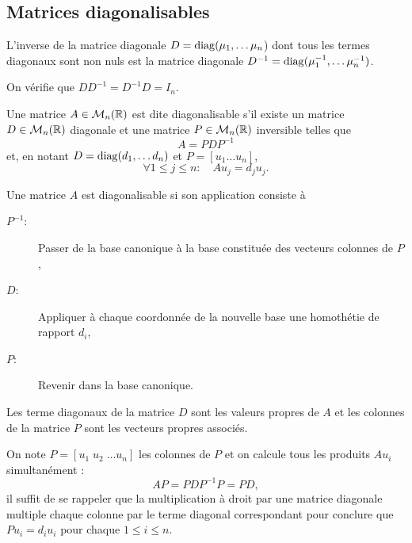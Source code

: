\subsection{Matrices diagonalisables} \label{sec:MatDiag}

\begin{lemma*}
  L'inverse de la matrice diagonale $D = \operatorname{diag}(\mu_1, \dots \mu_n$) dont tous les termes diagonaux sont non nuls est la matrice diagonale $D^{-1} = \operatorname{diag}(\mu_1^{-1}, \dots \mu_n^{-1})$.
\end{lemma*}

\proof
On vérifie que $D D^{-1} = D^{-1} D = I_n$.
\eproof

\begin{definition*}
  Une matrice $A \in \mathcal{M}_n(\mathbb{R})$ est dite diagonalisable s'il existe un matrice $D \in \mathcal{M}_n(\mathbb{R})$ diagonale et une matrice $P \in \mathcal{M}_n(\mathbb{R})$ inversible telles que
  $$
  A = P D P^{-1}
  $$
  et, en notant $D = \operatorname{diag}(d_1, \dots d_n)$ et $P = [u_1 \dots u_n]$, 
  $$
  \forall 1 \leq j \leq n: \quad A u_j = d_j u_j.
  $$
\end{definition*}

\remark
Une matrice $A$ est diagonalisable si son application consiste à
\begin{description}
 \item[$P^{-1}$:] Passer de la base canonique à la base constituée des vecteurs colonnes de $P$,
 \item[$D$:] Appliquer à chaque coordonnée de la nouvelle base une homothétie de rapport $d_i$,
 \item[$P$:] Revenir dans la base canonique.
\end{description}

\begin{proposition*}
  Les terme diagonaux de la matrice $D$ sont les valeurs propres de $A$ et les colonnes de la matrice $P$ sont les vecteurs propres associés.
\end{proposition*}

\proof
  On note $P = [u_1 \; u_2 \; \dots u_n]$ les colonnes de $P$ et on calcule tous les produits $A u_i$ simultanément : 
  $$
  A P = P D P^{-1} P = P D,
  $$
  il suffit de se rappeler que la multiplication à droit par une matrice diagonale multiple chaque colonne par le terme diagonal correspondant pour conclure que $P u_i = d_i u_i$ pour chaque $1 \leq i \leq n$.
\eproof

